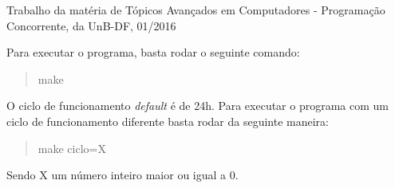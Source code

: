 Trabalho da matéria de Tópicos Avançados em Computadores -\/ Programação Concorrente, da Un\+B-\/\+DF, 01/2016

Para executar o programa, basta rodar o seguinte comando\+: \begin{quote}
make \end{quote}


O ciclo de funcionamento {\itshape default} é de 24h. Para executar o programa com um ciclo de funcionamento diferente basta rodar da seguinte maneira\+:

\begin{quote}
make ciclo=X \end{quote}


Sendo X um número inteiro maior ou igual a 0. 